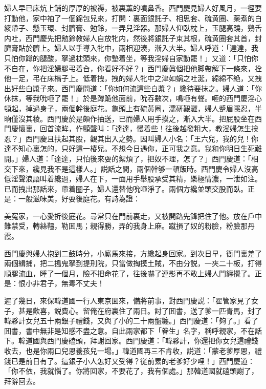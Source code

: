 婦人早已床炕上鋪的厚厚的被褥，被裏薰的噴鼻香。西門慶見婦人好風月，一徑要打動他，家中袖了一個錦包兒來，打開：裏面銀託子、相思套、硫黄圈、薬煮的白綾帶子、懸玉環、封臍膏、勉鈴，一弄兒淫器。那婦人仰臥枕上，玉腿高蹺，鷄舌内吐，西門慶先把勉鈴教婦人自放牝内，然後將銀託子束其根，硫黄圈套其首，封臍膏貼於臍上。婦人以手導入牝中，兩相迎湊，漸入大半。婦人呼道：「達達，我只怕你蹲的腿酸，拏過枕頭來，你墊着坐，等我淫婦自家動罷！」又道：「只怕你不自在，你把淫婦腿弔着㒲，你看好不好？」西門慶眞個把他脚帶解下一條來，拴他一足，弔在床槅子上。低着拽，拽的婦人牝中之津如蜗之吐涎，綿綿不絶，又拽出好些白漿子來。西門慶問道：「你如何流這些白漿？」纔待要抹之。婦人道：「你休抹，等我吮咂了罷！」於是蹲跪他面前，吮吞數次，鳴咂有聲。咂的西門慶淫心頓起，掉過身子，兩個幹後庭花。龜頭上有硫黃圈，濡硏艱澀，婦人蹙眉隱忍，半晌僅沒其稜。西門慶於是頗作抽送，已而婦人用手摸之，漸入大半。把屁股坐在西門慶懷裏，回首流眸，作顫聲叫：「達達，慢着些！往後越發粗大，教淫婦怎生挨忍？」西門慶且扶起其股，觀其出入之勢。因叫婦人小名：「王六兒，我的兒！你達不知心裏怎的，只好這一樁兒。不想今日遇你，正可我之意。我和你明日生死難開。」婦人道：「達達，只怕後來耍的絮煩了，把奴不理，怎了？」西門慶道：「相交下來，纔見我不是這樣人。」説話之間，兩個幹够一頓飯時。西門慶令婦人沒高低淫聲浪語叫着纔過，婦人在下，一面用手舉股承受其精，樂極情濃，一泄如注。已而拽出那話來，帶着圈子，婦人還替他吮咂淨了。兩個方纔並頭交股而臥。正是：一般滋味美，好耍後庭花。有詩為證：

\begin{myquote}
美寃家，一心愛折後庭花。尋常只在門前裏走，又被開路先鋒把住了他。放在戶中難禁受，轉絲韁，勒囬馬；親得勝，弄的我身上麻。蹴損了奴的粉臉，粉臉那丹霞。
\end{myquote}

西門慶與婦人抱到二鼓時分，小廝馬來接，方纔起身回家。到次日早，衙門裏差了兩個緝捕，把二搗鬼拏到提刑院，只當做掏摸土賊，不由分説，一夾二十板，打得順腿流血，睡了一個月，險不把命花了，往後嚇了連影再不敢上婦人門纏攪了。正是：恨小非君子，無毒不丈夫！

遲了幾日，來保韓道國一行人東京囬來，備將前事，對西門慶説：「翟管家見了女子，甚是歡喜，説費心。留俺在府裏住了兩日。討了囬書，送了爹一匹青馬，封了韓夥計女兒五十兩銀子禮錢，又與了小的二十兩盤纏。」西門慶道：「夠了。」看了囬書，書中無非是知感不盡之意。自此兩家都下「眷生」名字，稱呼親家，不在話下。韓道國與西門慶磕頭，拜謝回家。西門慶道：「韓夥計，你還把你女兒這禮錢收去，也是你兩口兒恩養孩兒一場。」韓道國再三不肯收，説道：「蒙老爹厚恩，禮錢已是前日有了。這銀子小人怎好又受得？従前累的老爹好少哩！」西門慶道：「你不依，我就惱了。你將回家，不要花了，我有個處。」那韓道國就磕頭謝了，拜辭回去。

